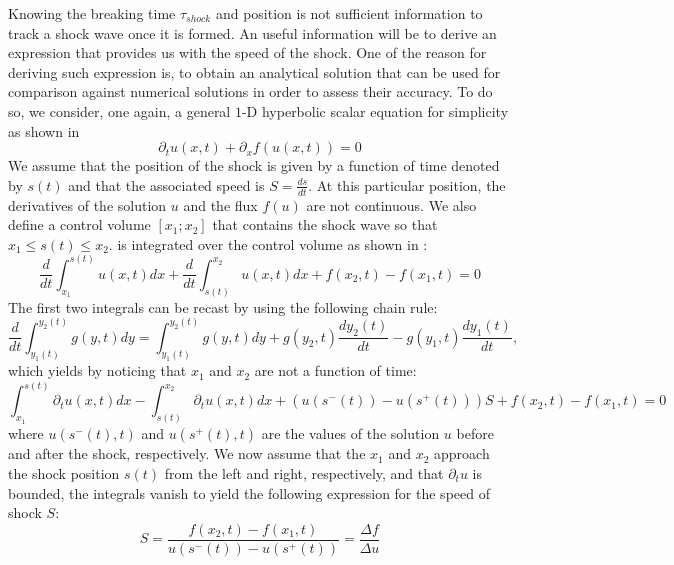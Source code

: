 Knowing the breaking time $\tau_{shock}$ and position is not sufficient information to track a shock wave once it is formed. An useful information will be to derive an expression that provides us with the speed of the shock. One of the reason for deriving such expression is, to obtain an analytical solution that can be used for comparison against numerical solutions in order to assess their accuracy. To do so, we consider, one again, a general $1$-D hyperbolic scalar equation for simplicity as shown in 
%
\begin{equation}\label{eq:rh_sct1b}
\partial_t u(x,t) + \partial_x f(u(x,t)) = 0
\end{equation}
%
We assume that the position of the shock is given by a function of time denoted by $s(t)$ and that the associated speed is $S = \frac{ds}{dt}$. At this particular position, the derivatives of the solution $u$ and the flux $f(u)$ are not continuous. We also define a control volume $\left[ x_1; x_2 \right]$ that contains the shock wave so that $x_1 \leq s(t) \leq x_2$.  is integrated over the control volume as shown in :
%
\begin{equation}\label{eq:rh2_sct1b}
\frac{d}{dt} \int_{x_1}^{s(t)} u(x,t) dx + \frac{d}{dt} \int_{s(t)}^{x_2} u(x,t) dx + f(x_2,t) - f(x_1,t) = 0
\end{equation}
% 
The first two integrals can be recast by using the following chain rule:
%
\begin{equation}\label{eq:rh3_sct1b}
\frac{d}{dt} \int_{y_1(t)}^{y_2(t)} g(y,t) dy =  \int_{y_1(t)}^{y_2(t)} g(y,t) dy + g(y_2,t) \frac{d y_2(t)}{dt} - g(y_1,t) \frac{d y_1(t)}{dt},
\end{equation}
% 
which yields by noticing that $x_1$ and $x_2$ are not a function of time:
%
\begin{equation}\label{eq:rh4_sct1b}
\int_{x_1}^{s(t)} \partial_t u(x,t) dx - \int_{s(t)}^{x_2} \partial_t u(x,t) dx + \left( u(s^-(t)) - u(s^+(t)) \right) S + f(x_2,t) - f(x_1,t) = 0
\end{equation}
%
where $u(s^-(t),t)$ and $u(s^+(t),t)$ are the values of the solution $u$ before and after the shock, respectively. We now assume that the $x_1$ and $x_2$ approach the shock position $s(t)$ from the left and right, respectively, and that $\partial_t u$ is bounded, the integrals vanish to yield the following expression for the speed of shock $S$:
%
\begin{equation}\label{eq:rh5_sct1b}
S = \frac{f(x_2,t) - f(x_1,t)}{u(s^-(t)) - u(s^+(t))} = \frac{\Delta f}{\Delta u}
\end{equation}

